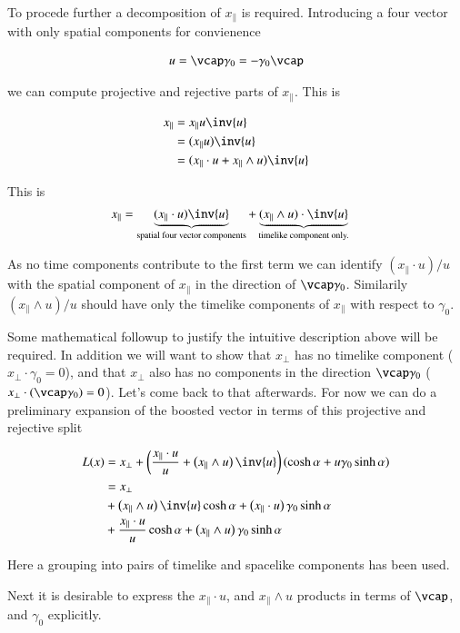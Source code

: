 \documentclass{article}
\begin{document}
To procede further a decomposition of $x_\parallel$ is required.  Introducing a four vector with only spatial components for
convienence

\begin{align}
u = \vcap \gamma_0 = - \gamma_0 \vcap
\end{align}

we can compute projective and rejective parts of $x_\parallel$.  This is

\begin{align*}
x_\parallel 
&= x_\parallel u \inv{u} \\
&= (x_\parallel u ) \inv{u} \\
&= (x_\parallel \cdot u + x_\parallel \wedge u) \inv{u} \\
\end{align*}

This is
\begin{align}
x_\parallel &= \underbrace{(x_\parallel \cdot u) \inv{u}}_{\text{spatial four vector components}} + \underbrace{(x_\parallel \wedge u) \cdot \inv{u} }_{\text{timelike component only.}}
\end{align}

As no time components contribute to the first term we can identify $(x_\parallel \cdot u)/u$ with the spatial component of $x_\parallel$ in the direction of $\vcap \gamma_0$.  Similarily $(x_\parallel\wedge u)/u$ should have only the timelike components of $x_\parallel$ with respect to $\gamma_0$.

Some mathematical followup to justify the intuitive description above will be required.  In addition we will want to show that $x_\perp$ has no timelike component ($x_\perp \cdot \gamma_0 = 0$), and that $x_\perp$ also has no components in the direction $\vcap \gamma_0$ ($x_\perp \cdot (\vcap\gamma_0) = 0$).
Let's come back to that afterwards.  For now we can do a preliminary expansion of the boosted vector in terms of this 
projective and rejective split

\begin{align*}
L(x)
&= x_\perp + \left(
\frac{x_\parallel \cdot u}{u} + \left(x_\parallel \wedge u\right) \inv{u} 
\right)\left(\cosh\alpha + u \gamma_0 \sinh\alpha\right) \\
&= x_\perp \\
&+ \left(x_\parallel \wedge u\right) \inv{u} \cosh\alpha 
+ \left(x_\parallel \cdot u\right) \gamma_0 \sinh\alpha \\
&+ \frac{x_\parallel \cdot u}{u} \cosh\alpha 
+ \left(x_\parallel \wedge u\right) \gamma_0 \sinh\alpha
\end{align*}

Here a grouping into pairs of timelike and spacelike components has been used.

Next it is desirable to express the $x_\parallel \cdot u$, and $x_\parallel \wedge u$ products in terms of $\vcap$, and $\gamma_0$ explicitly.



\end{document}
